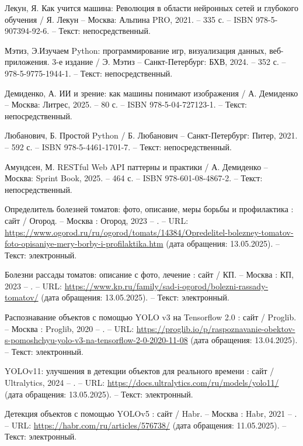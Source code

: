 \begin{thebibliography}{9}
	 Лекун, Я. Как учится машина: Революция в области нейронных сетей и глубокого обучения / Я. Лекун – Москва: Альпина PRO, 2021. – 335 с. – ISBN 978-5-907394-92-6. – Текст: непосредственный.
	
     Мэтиз, Э.Изучаем Python: программирование игр, визуализация данных, веб-приложения. 3-е издание / Э. Мэтиз – Санкт-Петербург: БХВ, 2024. – 352 с. – 978-5-9775-1944-1. – Текст: непосредственный.
    
     Демиденко, А. ИИ и зрение: как машины понимают изображения / А. Демиденко – Москва: Литрес, 2025. – 80 с. – ISBN 978-5-04-727123-1. – Текст: непосредственный.
    
     Любанович, Б. Простой Python / Б. Любанович – Санкт-Петербург: Питер, 2021. – 592 с. – ISBN 978-5-4461-1701-7. – Текст: непосредственный.
    
     Амундсен, М. RESTful Web API паттерны и практики / А. Демиденко – Москва: Sprint Book, 2025. – 464 с. – ISBN 978-601-08-4867-2. – Текст: непосредственный.
    
	 Определитель болезней томатов: фото, описание, меры борьбы и профилактика : сайт / Огород. – Москва : Огород, 2023 – . – URL: \url{https://www.ogorod.ru/ru/ogorod/tomats/14384/Opredelitel-bolezney-tomatov-foto-opisaniye-mery-borby-i-profilaktika.htm} (дата обращения: 13.05.2025). – Текст: электронный.
	
	 Болезни рассады томатов: описание с фото, лечение : сайт / КП. – Москва : КП, 2023 – . – URL: \url{https://www.kp.ru/family/sad-i-ogorod/bolezni-rassady-tomatov/} (дата обращения: 13.05.2025). – Текст: электронный.

	 Распознавание объектов с помощью YOLO v3 на Tensorflow 2.0 : сайт / Proglib. – Москва : Proglib, 2020 – . – URL: \url{https://proglib.io/p/raspoznavanie-obektov-s-pomoshchyu-yolo-v3-na-tensorflow-2-0-2020-11-08} (дата обращения: 13.04.2025). – Текст: электронный.
	
	 YOLOv11: улучшения в детекции объектов для реального времени : сайт / Ultralytics, 2024 – . – URL: \url{https://docs.ultralytics.com/ru/models/yolo11/} (дата обращения: 13.05.2025). – Текст: электронный.
	
	 Детекция объектов с помощью YOLOv5 : сайт / Habr. – Москва : Habr, 2021 – . – URL: \url{https://habr.com/ru/articles/576738/} (дата обращения: 11.05.2025). – Текст: электронный.
	

\end{thebibliography}
